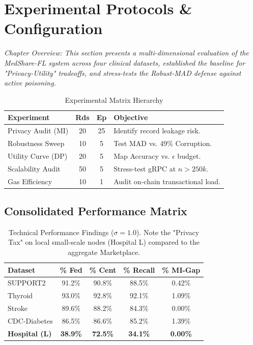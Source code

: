 \documentclass[10pt, a4paper, twocolumn]{article}
\begin{document}
\section{Experimental Protocols \& Configuration}

\textit{Chapter Overview: This section presents a multi-dimensional evaluation of the MedShare-FL system across four clinical datasets, established the baseline for "Privacy-Utility" tradeoffs, and stress-tests the Robust-MAD defense against active poisoning.}

\begin{table}[hbt!]
\centering
\scriptsize
\begin{tabular}{lccl}
\toprule
\textbf{Experiment} & \textbf{Rds} & \textbf{Ep} & \textbf{Objective} \\
\midrule
Privacy Audit (MI) & 20 & 25 & Identify record leakage risk. \\
Robustness Sweep & 10 & 5 & Test MAD vs. 49\% Corruption. \\
Utility Curve (DP) & 20 & 5 & Map Accuracy vs. $\epsilon$ budget. \\
Scalability Audit & 50 & 5 & Stress-test gRPC at $n > 250k$. \\
Gas Efficiency & 10 & 1 & Audit on-chain transactional load. \\
\bottomrule
\end{tabular}
\caption{Experimental Matrix Hierarchy}
\end{table}

\subsection{Consolidated Performance Matrix}
\begin{table}[hbt!]
\centering
\scriptsize
\begin{tabular}{lcccc}
\toprule
\textbf{Dataset} & \textbf{\% Fed} & \textbf{\% Cent} & \textbf{\% Recall} & \textbf{\% MI-Gap} \\
\midrule
SUPPORT2 & 91.2\% & 90.8\% & 88.5\% & 0.42\% \\
Thyroid & 93.0\% & 92.8\% & 92.1\% & 1.09\% \\
Stroke & 89.6\% & 88.2\% & 84.3\% & 0.00\% \\
CDC-Diabetes & 86.5\% & 86.6\% & 85.2\% & 1.39\% \\
\textbf{Hospital (L)} & \textbf{38.9\%} & \textbf{72.5\%} & \textbf{34.1\%} & \textbf{0.00\%} \\
\bottomrule
\end{tabular}
\caption{Technical Performance Findings ($\sigma=1.0$). Note the "Privacy Tax" on local small-scale nodes (Hospital L) compared to the aggregate Marketplace.}
\end{table}
\end{document}
